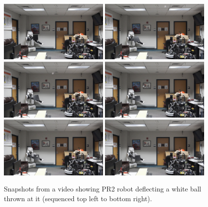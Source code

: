 \documentclass[a4paper]{report}
\begin{document}
\begin{figure}[H]
\centering
\includegraphics[trim=200 100 450 0, clip, width=0.48\textwidth]{s1}
\vspace{1mm}
\includegraphics[trim=200 100 450 0, clip, width=0.48\textwidth]{s2}
\includegraphics[trim=200 100 450 0, clip, width=0.48\textwidth]{s3}
\vspace{1mm}
\includegraphics[trim=200 100 450 0, clip, width=0.48\textwidth]{s4}
\includegraphics[trim=200 100 450 0, clip, width=0.48\textwidth]{s5}
\vspace{1mm}
\includegraphics[trim=200 100 450 0, clip, width=0.48\textwidth]{s6}

    \caption{Snapshots from a video showing PR2 robot deflecting a white ball thrown at it (sequenced top left to bottom right).}
    \label{fig:shield_demo}
\end{figure}
\end{document}

